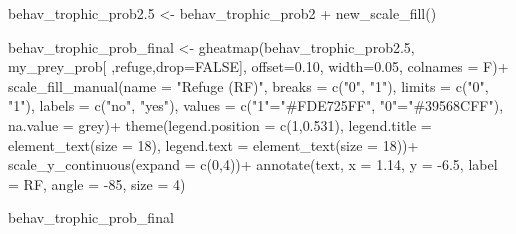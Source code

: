 \documentclass[
]{article}
\newenvironment{Shaded}{\begin{snugshade}}{\end{snugshade}}
\newcommand{\AttributeTok}[1]{\textcolor[rgb]{0.77,0.63,0.00}{#1}}
\newcommand{\ConstantTok}[1]{\textcolor[rgb]{0.00,0.00,0.00}{#1}}
\newcommand{\DecValTok}[1]{\textcolor[rgb]{0.00,0.00,0.81}{#1}}
\newcommand{\FloatTok}[1]{\textcolor[rgb]{0.00,0.00,0.81}{#1}}
\newcommand{\FunctionTok}[1]{\textcolor[rgb]{0.00,0.00,0.00}{#1}}
\newcommand{\NormalTok}[1]{#1}
\newcommand{\OtherTok}[1]{\textcolor[rgb]{0.56,0.35,0.01}{#1}}
\newcommand{\SpecialCharTok}[1]{\textcolor[rgb]{0.00,0.00,0.00}{#1}}
\newcommand{\StringTok}[1]{\textcolor[rgb]{0.31,0.60,0.02}{#1}}
\begin{document}
\begin{Shaded}
\begin{Highlighting}[]
\NormalTok{behav\_trophic\_prob2}\FloatTok{.5} \OtherTok{\textless{}{-}}\NormalTok{ behav\_trophic\_prob2 }\SpecialCharTok{+} \FunctionTok{new\_scale\_fill}\NormalTok{()}

\NormalTok{behav\_trophic\_prob\_final }\OtherTok{\textless{}{-}} \FunctionTok{gheatmap}\NormalTok{(behav\_trophic\_prob2}\FloatTok{.5}\NormalTok{, }
\NormalTok{                                     my\_prey\_prob[ ,}\StringTok{\textquotesingle{}refuge\textquotesingle{}}\NormalTok{,}\AttributeTok{drop=}\ConstantTok{FALSE}\NormalTok{], }
                                     \AttributeTok{offset=}\FloatTok{0.10}\NormalTok{, }\AttributeTok{width=}\FloatTok{0.05}\NormalTok{, }\AttributeTok{colnames =}\NormalTok{ F)}\SpecialCharTok{+}  
  \FunctionTok{scale\_fill\_manual}\NormalTok{(}\AttributeTok{name =} \StringTok{"Refuge (RF)"}\NormalTok{,}
                    \AttributeTok{breaks =} \FunctionTok{c}\NormalTok{(}\StringTok{"0"}\NormalTok{, }\StringTok{"1"}\NormalTok{),}
                    \AttributeTok{limits =} \FunctionTok{c}\NormalTok{(}\StringTok{"0"}\NormalTok{, }\StringTok{"1"}\NormalTok{),}
                    \AttributeTok{labels =} \FunctionTok{c}\NormalTok{(}\StringTok{"no"}\NormalTok{, }\StringTok{"yes"}\NormalTok{),}
                    \AttributeTok{values =} \FunctionTok{c}\NormalTok{(}\StringTok{"1"}\OtherTok{=}\StringTok{"\#FDE725FF"}\NormalTok{, }\StringTok{"0"}\OtherTok{=}\StringTok{"\#39568CFF"}\NormalTok{),}
                    \AttributeTok{na.value =} \StringTok{\textquotesingle{}grey\textquotesingle{}}\NormalTok{)}\SpecialCharTok{+}
  \FunctionTok{theme}\NormalTok{(}\AttributeTok{legend.position =} \FunctionTok{c}\NormalTok{(}\DecValTok{1}\NormalTok{,}\FloatTok{0.531}\NormalTok{),}
        \AttributeTok{legend.title =} \FunctionTok{element\_text}\NormalTok{(}\AttributeTok{size =} \DecValTok{18}\NormalTok{), }
        \AttributeTok{legend.text =} \FunctionTok{element\_text}\NormalTok{(}\AttributeTok{size =} \DecValTok{18}\NormalTok{))}\SpecialCharTok{+}
  \FunctionTok{scale\_y\_continuous}\NormalTok{(}\AttributeTok{expand =} \FunctionTok{c}\NormalTok{(}\DecValTok{0}\NormalTok{,}\DecValTok{4}\NormalTok{))}\SpecialCharTok{+}
  \FunctionTok{annotate}\NormalTok{(}\StringTok{\textquotesingle{}text\textquotesingle{}}\NormalTok{, }\AttributeTok{x =} \FloatTok{1.14}\NormalTok{, }\AttributeTok{y =} \SpecialCharTok{{-}}\FloatTok{6.5}\NormalTok{, }\AttributeTok{label =} \StringTok{\textquotesingle{}RF\textquotesingle{}}\NormalTok{, }\AttributeTok{angle =} \SpecialCharTok{{-}}\DecValTok{85}\NormalTok{, }\AttributeTok{size =} \DecValTok{4}\NormalTok{)}

\NormalTok{behav\_trophic\_prob\_final}
\end{Highlighting}
\end{Shaded}
\end{document}
